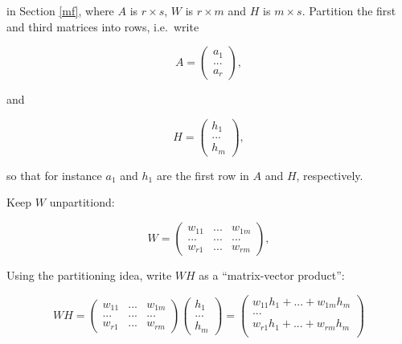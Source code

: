 in Section \ref{mf}, where $A$ is $r \times s$, $W$ is $r \times m$ and
$H$ is $m \times s$.  Partition the first and third  matrices into rows, i.e.\
write


\begin{equation}
A =
\left (
\begin{array}{c}
a_1 \\
... \\
a_r 
\end{array}
\right ),
\end{equation}

and

\begin{equation}
H =
\left (
\begin{array}{c}
h_1 \\
... \\
h_m 
\end{array}
\right ),
\end{equation}

so that for instance $a_1$ and $h_1$ are the first row in $A$ and $H$,
respectively.

Keep $W$ unpartitiond:

\begin{equation}
W = 
\left (
\begin{array}{ccc}
w_{11} & ... & w_{1m}\\
... & ... & ... \\
w_{r1} & ... & w_{rm}
\end{array}
\right ),
\end{equation}

Using the partitioning idea, write $WH$ as a ``matrix-vector product'':

\begin{equation}
WH =
\left (
\begin{array}{ccc}
w_{11} & ... & w_{1m}\\
... & ... & ... \\
w_{r1} & ... & w_{rm}
\end{array}
\right )
\left (
\begin{array}{cc}
h_1 \\
... \\
h_m 
\end{array}
\right )
=
\left (
\begin{array}{cc}
w_{11}h_1 + ... + w_{1m} h_m \\
... \\
w_{r1}h_1 + ... + w_{rm} h_m \\
\end{array}
\right )
\end{equation}

